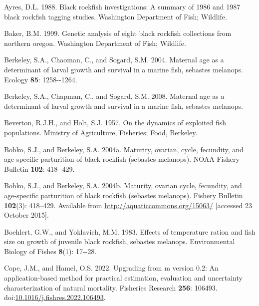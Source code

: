 \documentclass[11pt,
  letterpaper,
]{article}
\newlength{\cslhangindent}
\newenvironment{CSLReferences}[2] %
 {%
  \setlength{\parindent}{0pt}
  \ifodd #1 \everypar{\setlength{\hangindent}{\cslhangindent}}\ignorespaces\fi
  \ifnum #2 > 0
  \setlength{\parskip}{#2\baselineskip}
  \fi
 }%
 {}
\begin{document}
\hypertarget{refs}{}
\begin{CSLReferences}{1}{0}
\leavevmode{}%
Ayres, D.L. 1988. Black rockfish investigations: A summary of 1986 and 1987 black rockfish tagging studies. Washington Department of Fish; Wildlife.

\leavevmode{}%
Baker, B.M. 1999. Genetic analysis of eight black rockfish collections from northern oregon. Washington Department of Fish; Wildlife.

\leavevmode{}%
Berkeley, S.A., Chaoman, C., and Sogard, S.M. 2004. Maternal age as a determinant of larval growth and survival in a marine fish, sebastes melanops. Ecology \textbf{85}: 1258-\/-1264.

\leavevmode{}%
Berkeley, S.A., Chapman, C., and Sogard, S.M. 2008. Maternal age as a determinant of larval growth and survival in a marine fish, sebastes melanops.

\leavevmode{}%
Beverton, R.J.H., and Holt, S.J. 1957. On the dynamics of exploited fish populations. Ministry of Agriculture, Fisheries; Food, Berkeley.

\leavevmode{}%
Bobko, S.J., and Berkeley, S.A. 2004a. Maturity, ovarian, cycle, fecundity, and age-specific parturition of black rockfish (sebastes melanops). NOAA Fishery Bulletin \textbf{102}: 418-\/-429.

\leavevmode{}%
Bobko, S.J., and Berkeley, S.A. 2004b. Maturity, ovarian cycle, fecundity, and age-specific parturition of black rockfish (sebastes melanops). Fishery Bulletin \textbf{102}(3): 418--429. Available from \url{http://aquaticcommons.org/15063/} {[}accessed 23 October 2015{]}.

\leavevmode{}%
Boehlert, G.W., and Yoklavich, M.M. 1983. Effects of temperature ration and fish size on growth of juvenile black rockfish, sebastes melanops. Environmental Biology of Fishes \textbf{8}(1): 17-\/-28.

\leavevmode{}%
Cope, J.M., and Hamel, O.S. 2022. Upgrading from m version 0.2: An application-based method for practical estimation, evaluation and uncertainty characterization of natural mortality. Fisheries Research \textbf{256}: 106493. doi:\href{https://doi.org/10.1016/j.fishres.2022.106493}{10.1016/j.fishres.2022.106493}.


\end{CSLReferences}
\end{document}
